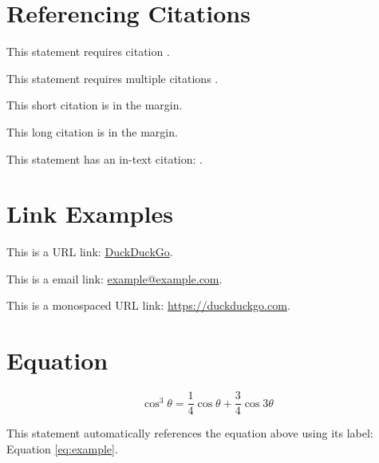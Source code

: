 \documentclass[
	a4paper, %
	12pt, %
]{CSSullivanBusinessReport}
\begin{document}

\section{Referencing Citations}

This statement requires citation \autocite{Smith:2024jd}.

This statement requires multiple citations \autocite{Smith:2024jd, Smith:2023qr}.

This short citation is in the margin.

This long citation is in the margin.

This statement has an in-text citation: \textcite{Smith:2024jd}.


\section{Link Examples}

This is a URL link: \href{https://www.duckduckgo.com}{DuckDuckGo}.

This is a email link: \href{mailto:example@example.com}{example@example.com}.

This is a monospaced URL link: \url{https://duckduckgo.com}.


\section{Equation}

\begin{equation}
	\cos^3 \theta =\frac{1}{4}\cos\theta+\frac{3}{4}\cos 3\theta
	\label{eq:example}
\end{equation}

This statement automatically references the equation above using its label: Equation \ref{eq:example}.
\end{document}

